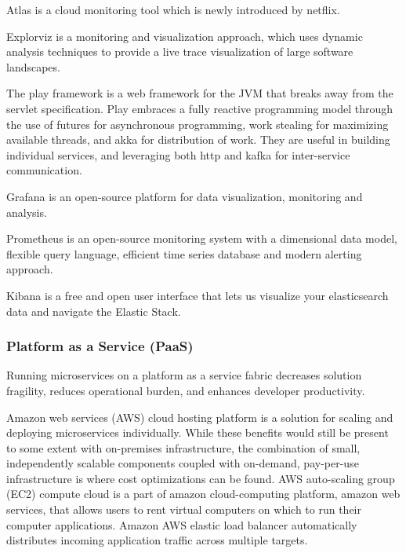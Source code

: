 Atlas is a cloud monitoring tool which is newly introduced by netflix.\cite{Netflix}

Explorviz is a monitoring and visualization approach, which uses dynamic analysis techniques to provide a live trace visualization of large software landscapes.\cite{Lenga2019}

The play framework is a web framework for the JVM that breaks away from the servlet specification. Play embraces a fully reactive programming model through the use of futures for asynchronous programming, work stealing for maximizing available threads, and akka for distribution of work. They are useful in building individual services, and leveraging both http and kafka for inter-service communication.\cite{khan2017}

Grafana is an open-source platform for data visualization, monitoring and analysis.\cite{Kalske2017paper,KalskeM2017} 

Prometheus is an open-source monitoring system with a dimensional data model, flexible query language, efficient time series database and modern alerting approach.\cite{Kalske2017paper, KalskeM2017} 

Kibana is a free and open user interface that lets us visualize your elasticsearch data and navigate the Elastic Stack.\cite{Kalske2017paper, KalskeM2017} 


\subsubsection{Platform as a Service (PaaS)}

Running microservices on a platform as a service fabric decreases solution fragility, reduces operational burden, and enhances developer productivity.\cite{rosa2018, Mikail2020}

Amazon web services (AWS) cloud hosting platform is a solution for scaling and deploying microservices individually.  
While these benefits would still be present to some extent with on-premises infrastructure, the combination of small, independently scalable components coupled with on-demand, pay-per-use infrastructure is where cost optimizations can be found.%
%
AWS auto-scaling group (EC2) compute cloud is a part of amazon cloud-computing platform, amazon web services, that allows users to rent virtual computers on which to run their computer applications.%
%
Amazon AWS elastic load balancer automatically distributes incoming application traffic across multiple targets.\cite{McElhiney2018}


